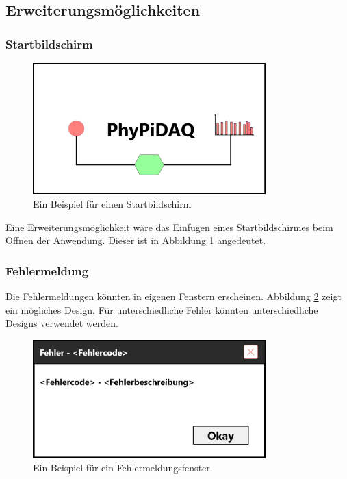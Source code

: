 \documentclass[parskip=full]{scrartcl}
\begin{document}
\clearpage

\subsection{Erweiterungsmöglichkeiten}

\subsubsection{Startbildschirm}

\begin{figure}[htbp]
	\begin{center}
		\includegraphics[width = 9cm]{Grafik/Startbildschirm.png}
		\caption{Ein Beispiel für einen Startbildschirm}
		\label{startbildschirm}
	\end{center}
\end{figure}

Eine Erweiterungsmöglichkeit wäre das Einfügen eines Startbildschirmes beim Öffnen der Anwendung. Dieser ist in Abbildung \ref{startbildschirm} angedeutet.

\subsubsection{Fehlermeldung}

Die Fehlermeldungen könnten in eigenen Fenstern erscheinen. Abbildung \ref{fehlerfenster} zeigt ein mögliches Design. Für unterschiedliche Fehler könnten unterschiedliche Designs verwendet werden.

\begin{figure}[htbp]
	\begin{center}
		\includegraphics[width = 9cm]{Grafik/Fehlerfenster}
		\caption{Ein Beispiel für ein Fehlermeldungsfenster}
		\label{fehlerfenster}
	\end{center}
\end{figure}
\end{document}
